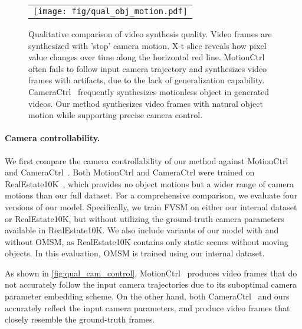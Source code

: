 \begin{figure*}[!t]
\centering
\begin{tabular}{@{}c}
\texttt{[image: fig/qual\_obj\_motion.pdf]} \\
\end{tabular}
\vspace{-4mm}
\caption{
Qualitative comparison of video synthesis quality.
Video frames are synthesized with 'stop' camera motion.
X-t slice reveals how pixel value changes over time along the horizontal red line.
MotionCtrl~\cite{wang2024motionctrl} often fails to follow input camera trajectory and synthesizes video frames with artifacts, due to the lack of generalization capability.
CameraCtrl~\cite{he2024cameractrl} frequently synthesizes motionless object in generated videos.
Our method synthesizes video frames with natural object motion while supporting precise camera control.
}
\label{fig:qual_obj_motion}
\vspace{-3mm}
\end{figure*}







\vspace{-4mm}
\paragraph{Camera controllability.}
We first compare the camera controllability of our method against MotionCtrl~\cite{wang2024motionctrl} and CameraCtrl~\cite{he2024cameractrl}.
Both MotionCtrl and CameraCtrl were trained on RealEstate10K~\cite{zhou2018stereo}, which provides no object motions but a wider range of camera motions than our full dataset.
For a comprehensive comparison, we evaluate four versions of our model.
Specifically, we train FVSM on either our internal dataset or RealEstate10K, but without utilizing the ground-truth camera parameters available in RealEstate10K.
We also include variants of our model with and without OMSM, as RealEstate10K contains only static scenes without moving objects.
In this evaluation, OMSM is trained using our internal dataset.



As shown in \cref{fig:qual_cam_control}, 
MotionCtrl~\cite{wang2024motionctrl} produces video frames that do not accurately follow the input camera trajectories due to its suboptimal camera parameter embedding scheme.
On the other hand, both CameraCtrl~\cite{he2024cameractrl} and ours accurately reflect the input camera parameters, and produce video frames that closely resemble the ground-truth frames.

